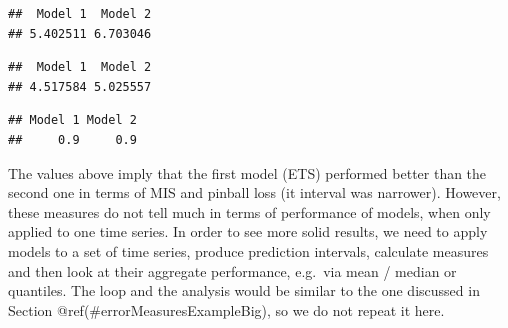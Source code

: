 \documentclass[
]{book}
\newenvironment{Shaded}{\begin{snugshade}}{\end{snugshade}}
\newcommand{\CommentTok}[1]{\textcolor[rgb]{0.56,0.35,0.01}{\textit{#1}}}
\newcommand{\FloatTok}[1]{\textcolor[rgb]{0.00,0.00,0.81}{#1}}
\newcommand{\FunctionTok}[1]{\textcolor[rgb]{0.00,0.00,0.00}{#1}}
\newcommand{\NormalTok}[1]{#1}
\newcommand{\SpecialCharTok}[1]{\textcolor[rgb]{0.00,0.00,0.00}{#1}}
\newcommand{\StringTok}[1]{\textcolor[rgb]{0.31,0.60,0.02}{#1}}
\theoremstyle{definition}
\theoremstyle{definition}
\theoremstyle{definition}
\theoremstyle{definition}
\theoremstyle{remark}
\begin{document}
\begin{verbatim}
##  Model 1  Model 2 
## 5.402511 6.703046
\end{verbatim}

\begin{Shaded}
\end{Shaded}

\begin{verbatim}
##  Model 1  Model 2 
## 4.517584 5.025557
\end{verbatim}

\begin{Shaded}
\end{Shaded}

\begin{verbatim}
## Model 1 Model 2 
##     0.9     0.9
\end{verbatim}

The values above imply that the first model (ETS) performed better than the second one in terms of MIS and pinball loss (it interval was narrower). However, these measures do not tell much in terms of performance of models, when only applied to one time series. In order to see more solid results, we need to apply models to a set of time series, produce prediction intervals, calculate measures and then look at their aggregate performance, e.g.~via mean / median or quantiles. The loop and the analysis would be similar to the one discussed in Section @ref(\#errorMeasuresExampleBig), so we do not repeat it here.
\end{document}
